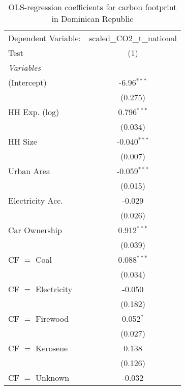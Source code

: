 
\begin{table}[htbp!]
   \centering
   \small
   \begin{adjustbox}{width = 1\textwidth, max height = 0.95\textheight, center}
      \begin{threeparttable}[b]
         \caption{\label{tab:OLS_2_DOM} OLS-regression coefficients for carbon footprint in Dominican Republic}
         \begin{tabular}{lc}
            \tabularnewline \midrule \midrule
            Dependent Variable: & scaled\_CO2\_t\_national\\     
            Test                & (1)\\  
            \midrule
            \emph{Variables}\\
            (Intercept)         & -6.96$^{***}$\\   
                                & (0.275)\\   
            HH Exp. (log)       & 0.796$^{***}$\\   
                                & (0.034)\\   
            HH Size             & -0.040$^{***}$\\   
                                & (0.007)\\   
            Urban Area          & -0.059$^{***}$\\   
                                & (0.015)\\   
            Electricity Acc.    & -0.029\\   
                                & (0.026)\\   
            Car Ownership       & 0.912$^{***}$\\   
                                & (0.039)\\   
            CF $=$ Coal         & 0.088$^{***}$\\   
                                & (0.034)\\   
            CF $=$ Electricity  & -0.050\\   
                                & (0.182)\\   
            CF $=$ Firewood     & 0.052$^{*}$\\   
                                & (0.027)\\   
            CF $=$ Kerosene     & 0.138\\   
                                & (0.126)\\   
            CF $=$ Unknown      & -0.032\\   

\end{tabular}
\end{threeparttable}
\end{adjustbox}
\end{table}
